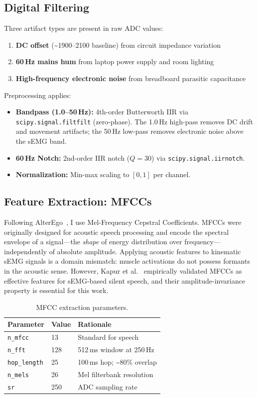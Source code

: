 \documentclass[11pt, a4paper]{article}
\begin{document}
\subsection{Digital Filtering}

Three artifact types are present in raw ADC values:
\begin{enumerate}
    \item \textbf{DC offset} (\textasciitilde1900--2100 baseline) from circuit impedance variation
    \item \textbf{60\,Hz mains hum} from laptop power supply and room lighting
    \item \textbf{High-frequency electronic noise} from breadboard parasitic capacitance
\end{enumerate}

Preprocessing applies:
\begin{itemize}
    \item \textbf{Bandpass (1.0--50\,Hz):} 4th-order Butterworth IIR via \texttt{scipy.signal.filtfilt} (zero-phase). The 1.0\,Hz high-pass removes DC drift and movement artifacts; the 50\,Hz low-pass removes electronic noise above the sEMG band.
    \item \textbf{60\,Hz Notch:} 2nd-order IIR notch ($Q = 30$) via \texttt{scipy.signal.iirnotch}.
    \item \textbf{Normalization:} Min-max scaling to $[0, 1]$ per channel.
\end{itemize}

\subsection{Feature Extraction: MFCCs}

Following AlterEgo~\cite{kapur2018}, I use Mel-Frequency Cepstral Coefficients. MFCCs were originally designed for acoustic speech processing and encode the spectral envelope of a signal---the \emph{shape} of energy distribution over frequency---independently of absolute amplitude. Applying acoustic features to kinematic sEMG signals is a domain mismatch: muscle activations do not possess formants in the acoustic sense. However, Kapur et al.~\cite{kapur2018} empirically validated MFCCs as effective features for sEMG-based silent speech, and their amplitude-invariance property is essential for this work.

\begin{table}[h]
\centering
\caption{MFCC extraction parameters.}
\label{tab:mfcc}
\begin{tabular}{@{}lll@{}}
\toprule
Parameter & Value & Rationale \\
\midrule
\texttt{n\_mfcc} & 13 & Standard for speech \\
\texttt{n\_fft} & 128 & 512\,ms window at 250\,Hz \\
\texttt{hop\_length} & 25 & 100\,ms hop; \textasciitilde80\% overlap \\
\texttt{n\_mels} & 26 & Mel filterbank resolution \\
\texttt{sr} & 250 & ADC sampling rate \\
\bottomrule
\end{tabular}
\end{table}
\end{document}
